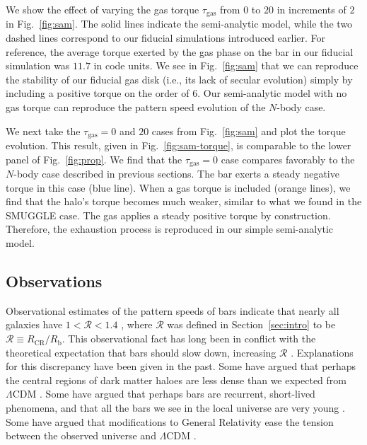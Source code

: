 \documentclass[fleqn,usenatbib]{mnras}
\newcommand{\RCR}{\ensuremath{R_{\textrm{CR}}}}
\newcommand{\Rot}{\ensuremath{\mathcal{R}}}
\newcommand{\Rb}{\ensuremath{R_{\textrm{b}}}}
\newcommand{\Nbody}{$N$-body}
\begin{document}
We show the effect of varying the gas torque $\tau_{\textrm{gas}}$ from $0$ to
$20$ in increments of $2$ in Fig.~\ref{fig:sam}. The solid lines indicate the
semi-analytic model, while the two dashed lines correspond to our fiducial
simulations introduced earlier. For reference, the average torque exerted by the
gas phase on the bar in our fiducial simulation was $11.7$ in code units. We see
in Fig.~\ref{fig:sam} that we can reproduce the stability of our fiducial gas
disk (i.e., its lack of secular evolution) simply by including a positive torque
on the order of $6$. Our semi-analytic model with no gas torque can reproduce
the pattern speed evolution of the $N$-body case.

We next take the $\tau_{\textrm{gas}}=0$ and $20$ cases from Fig.~\ref{fig:sam}
and plot the torque evolution. This result, given in Fig.~\ref{fig:sam-torque},
is comparable to the lower panel of Fig.~\ref{fig:prop}. We find that the
$\tau_{\textrm{gas}}=0$ case compares favorably to the \Nbody{} case described
in previous sections. The bar exerts a steady negative torque in this case (blue
line). When a gas torque is included (orange lines), we find that the halo's
torque becomes much weaker, similar to what we found in the SMUGGLE case. The
gas applies a steady positive torque by construction. Therefore, the exhaustion
process is reproduced in our simple semi-analytic model.

\subsection{Observations}
Observational estimates of the pattern speeds of bars indicate that nearly all
galaxies have $1 < \Rot < 1.4$ \citep{2011MSAIS..18...23C, 2015AA...576A.102A,
2019MNRAS.482.1733G, 2020MNRAS.491.3655G}, where $\Rot$ was defined in
Section~\ref{sec:intro} to be $\Rot\equiv \RCR/\Rb$. This observational fact has
long been in conflict with the theoretical expectation that bars should slow
down, increasing \Rot{} \citep[e.g.][]{1984MNRAS.209..729T, 1985MNRAS.213..451W,
2000ApJ...543..704D}. Explanations for this discrepancy have been given in the
past. Some have argued that perhaps the central regions of dark matter haloes
are less dense than we expected from $\Lambda\textrm{CDM}$
\citep[e.g.][]{2000ApJ...543..704D,2021AA...650L..16F}. Some have argued that
perhaps bars are recurrent, short-lived phenomena, and that all the bars we see
in the local universe are very young \citep{2002AA...392...83B,
2005MNRAS.364L..18B}. Some have argued that modifications to General Relativity
ease the tension between the observed universe and $\Lambda\textrm{CDM}$
\citep[e.g.][]{2021MNRAS.503.2833R, 2021MNRAS.508..926R}.
\end{document}
